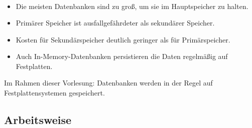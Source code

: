 \begin{frame}
	\frametitle{\insertsection}
	\framesubtitle{\insertsubsection}
    \\[6pt]
    \begin{itemize}
        \item Die meisten Datenbanken sind zu groß, um sie im Hauptspeicher zu halten.\\[4pt]
        \item Primärer Speicher ist ausfallgefährdeter als sekundärer Speicher.\\[4pt]
        \item Kosten für Sekundärspeicher deutlich geringer als f\"ur Prim\"arspeicher.\\[4pt]
        \item Auch In-Memory-Datenbanken persistieren die Daten regelm\"a\ss ig auf Festplatten.
    \end{itemize}
\pause
\abs
Im Rahmen dieser Vorlesung:
\nl
Datenbanken werden in der Regel auf Festplattensystemen gespeichert.
\end{frame}

\subsection{Arbeitsweise}

